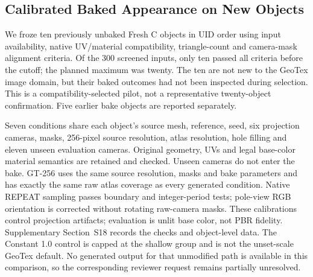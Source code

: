 \documentclass[times,twocolumn,final]{elsarticle}
\providecommand{\DIFadd}[1]{{\protect\color{blue} \sf #1}} %
\providecommand{\DIFaddbegin}{} %
\providecommand{\DIFaddend}{} %
\begin{document}
  \DIFaddbegin \subsection{Calibrated Baked Appearance on New Objects}
\label{subsec:new-bake}
\DIFadd{We froze ten previously unbaked Fresh C objects in UID order using input availability, native UV/material compatibility, triangle-count and camera-mask alignment criteria. Of the 300 screened inputs, only ten passed all criteria before the cutoff; the planned maximum was twenty. The ten are not new to the GeoTex image domain, but their baked outcomes had not been inspected during selection. This is a compatibility-selected pilot, not a representative twenty-object confirmation. Five earlier bake objects are reported separately.
}\DIFaddend 

  \DIFaddbegin \DIFadd{Seven conditions share each object's source mesh, reference, seed, six projection cameras, masks, 256-pixel source resolution, atlas resolution, hole filling and eleven unseen evaluation cameras. Original geometry, UVs and legal base-color material semantics are retained and checked. Unseen cameras do not enter the bake. GT-256 uses the same source resolution, masks and bake parameters and has exactly the same raw atlas coverage as every generated condition. Native REPEAT sampling passes boundary and integer-period tests; pole-view RGB orientation is corrected without rotating raw-camera masks. These calibrations control projection artifacts; evaluation is unlit base color, not PBR fidelity. Supplementary Section~S18 records the checks and object-level data. The Constant 1.0 control is capped at the shallow group and is not the unset-scale GeoTex default. No generated output for that unmodified path is available in this comparison, so the corresponding reviewer request remains partially unresolved.
}\DIFaddend 
\end{document}
